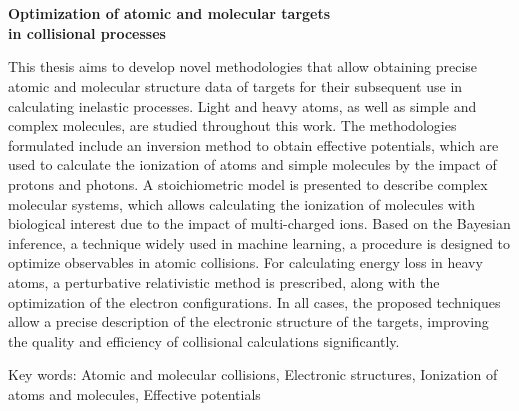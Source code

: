 \chapter*{}%
%

\begin{center}
\begin{large}
\textbf{Optimization of atomic and molecular targets \\
in collisional processes}
\end{large}
\end{center}

\vspace{1cm}
This thesis aims to develop novel methodologies that allow obtaining 
precise 
atomic and molecular structure data of targets for their subsequent use 
in calculating inelastic processes. Light and heavy atoms, as well as 
simple and complex molecules, are studied throughout this work. The 
methodologies formulated include an inversion method to 
obtain effective potentials, which are used to calculate the 
ionization of atoms and simple molecules by the impact of protons and 
photons. A stoichiometric model is presented to describe complex 
molecular systems, which allows calculating the ionization of molecules 
with biological interest due to the impact of multi-charged ions. Based 
on the Bayesian inference, a technique widely used in machine learning, 
a procedure is designed to optimize observables in atomic 
collisions. For calculating energy loss in heavy atoms, a perturbative 
relativistic method is prescribed, along with the optimization of the 
electron 
configurations. In all cases, the proposed techniques allow a precise 
description of the electronic structure of the targets, improving the 
quality and efficiency of collisional calculations significantly.

\vspace{1cm}
\noindent
Key words: 
Atomic and molecular collisions, 
Electronic structures, 
Ionization of atoms and molecules, 
Effective potentials 

